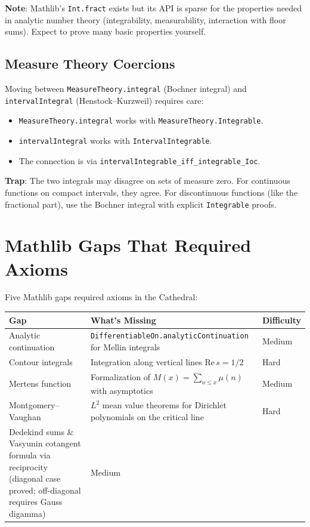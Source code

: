 \documentclass[11pt,a4paper]{article}
\newcommand{\lean}[1]{\texttt{#1}}
\begin{document}
\textbf{Note}: Mathlib's \lean{Int.fract} exists but its API is
sparse for the properties needed in analytic number theory
(integrability, measurability, interaction with floor sums).
Expect to prove many basic properties yourself.

\subsection{Measure Theory Coercions}

Moving between \lean{MeasureTheory.integral} (Bochner integral) and
\lean{intervalIntegral} (Henstock--Kurzweil) requires care:

\begin{itemize}
  \item \lean{MeasureTheory.integral} works with
    \lean{MeasureTheory.Integrable}.
  \item \lean{intervalIntegral} works with
    \lean{IntervalIntegrable}.
  \item The connection is via
    \lean{intervalIntegrable\_iff\_integrable\_Ioc}.
\end{itemize}

\textbf{Trap}: The two integrals may disagree on sets of measure zero.
For continuous functions on compact intervals, they agree. For
discontinuous functions (like the fractional part), use the Bochner
integral with explicit \lean{Integrable} proofs.

\section{Mathlib Gaps That Required Axioms}
\label{sec:gaps}

Five Mathlib gaps required axioms in the Cathedral:

\begin{center}
\begin{tabular}{@{}lp{6cm}l@{}}
\toprule
\textbf{Gap} & \textbf{What's Missing} & \textbf{Difficulty} \\
\midrule
Analytic continuation & \lean{DifferentiableOn.analyticContinuation}
  for Mellin integrals & Medium \\
Contour integrals & Integration along vertical lines
  $\mathrm{Re}\,s = 1/2$ & Hard \\
Mertens function & Formalization of $M(x) = \sum_{n \leq x} \mu(n)$
  with asymptotics & Medium \\
Montgomery--Vaughan & $L^2$ mean value theorems for Dirichlet
  polynomials on the critical line & Hard \\
Dedekind sums \& Vasyunin cotangent formula via reciprocity
  (diagonal case proved; off-diagonal requires Gauss digamma) & Medium \\
\bottomrule
\end{tabular}
\end{center}
\end{document}
